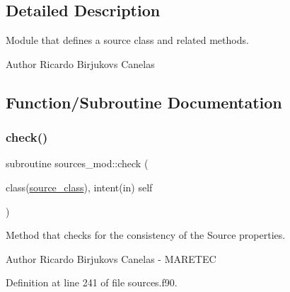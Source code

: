 \subsection{Detailed Description}
Module that defines a source class and related methods. 

\begin{DoxyAuthor}{Author}
Ricardo Birjukovs Canelas 
\end{DoxyAuthor}


\subsection{Function/\+Subroutine Documentation}
\mbox{\label{namespacesources__mod_a6fcfcb690cd1b9375915b01f7ddbe801}} 
\subsubsection{\texorpdfstring{check()}{check()}}
{\footnotesize\ttfamily subroutine sources\+\_\+mod\+::check (\begin{DoxyParamCaption}\item[{class(\mbox{\hyperlink{structsources__mod_1_1source__class}{source\+\_\+class}}), intent(in)}]{self }\end{DoxyParamCaption})\hspace{0.3cm}{\ttfamily [private]}}



Method that checks for the consistency of the Source properties. 

\begin{DoxyAuthor}{Author}
Ricardo Birjukovs Canelas -\/ M\+A\+R\+E\+T\+EC 
\end{DoxyAuthor}


Definition at line 241 of file sources.\+f90.


